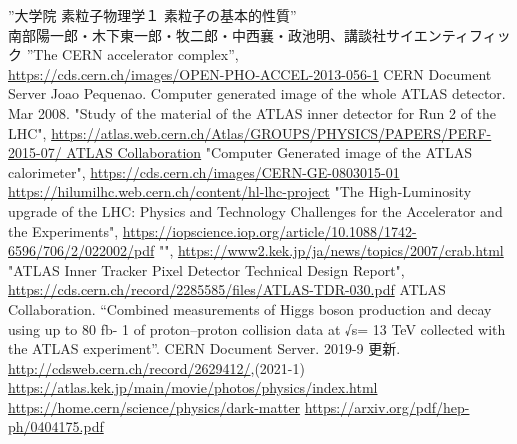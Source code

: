 \begin{thebibliography}{24}
”大学院 素粒子物理学１ 素粒子の基本的性質” \\ 南部陽一郎・木下東一郎・牧二郎・中西襄・政池明、講談社サイエンティフィック
”The CERN accelerator complex”,\\ \url{https://cds.cern.ch/images/OPEN-PHO-ACCEL-2013-056-1} CERN Document Server
Joao Pequenao. Computer generated image of the whole ATLAS detector. Mar 2008.
"Study of the material of the ATLAS inner detector for Run 2 of the LHC", \url{https://atlas.web.cern.ch/Atlas/GROUPS/PHYSICS/PAPERS/PERF-2015-07/ ATLAS Collaboration}
"Computer Generated image of the ATLAS calorimeter", \url{https://cds.cern.ch/images/CERN-GE-0803015-01}
\url{https://hilumilhc.web.cern.ch/content/hl-lhc-project}
"The High-Luminosity upgrade of the LHC: Physics and Technology Challenges for the Accelerator and the Experiments", \url{https://iopscience.iop.org/article/10.1088/1742-6596/706/2/022002/pdf}
"", \url{https://www2.kek.jp/ja/news/topics/2007/crab.html}
"ATLAS Inner Tracker Pixel Detector Technical Design Report", \url{https://cds.cern.ch/record/2285585/files/ATLAS-TDR-030.pdf}
ATLAS Collaboration. “Combined measurements of Higgs boson production and decay using up to 80 fb- 1 of proton–proton collision data at √s= 13 TeV collected with the ATLAS experiment”. CERN Document Server. 2019-9 更新. \url{http://cdsweb.cern.ch/record/2629412/},(2021-1)
\url{https://atlas.kek.jp/main/movie/photos/physics/index.html}
\url{https://home.cern/science/physics/dark-matter}
\url{https://arxiv.org/pdf/hep-ph/0404175.pdf}
\end{thebibliography}
